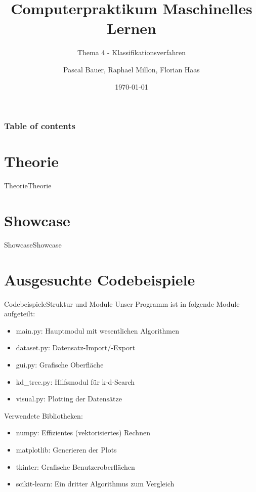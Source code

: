 \documentclass[9pt]{beamer}
\title{Computerpraktikum Maschinelles Lernen}
\subtitle{Thema 4 - Klassifikationsverfahren}
\author{Pascal Bauer, Raphael Millon, Florian Haas}
\institute{Sommersemester 2020}
\date{\today}
\begin{document}
\titlepage 

\begin{frame}
 \frametitle{Table of contents}
 \tableofcontents
\end{frame}

\section{Theorie}
\begin{frame}{Theorie}{Theorie}

\end{frame}

\section{Showcase}
\begin{frame}{Showcase}{Showcase}

\end{frame}

\section{Ausgesuchte Codebeispiele}
\begin{frame}{Codebeispiele}{Struktur und Module}
Unser Programm ist in folgende Module aufgeteilt:
\begin{itemize}
\item{main.py: Hauptmodul mit wesentlichen Algorithmen}
\item{dataset.py: Datensatz-Import/-Export}
\item{gui.py: Grafische Oberfläche}
\item{kd\_tree.py: Hilfsmodul für k-d-Search}
\item{visual.py: Plotting der Datensätze}
\end{itemize}

Verwendete Bibliotheken:
\begin{itemize}
\item{numpy: Effizientes (vektorisiertes) Rechnen}
\item{matplotlib: Generieren der Plots}
\item{tkinter: Grafische Benutzeroberflächen}
\item{scikit-learn: Ein dritter Algorithmus zum Vergleich}
\end{itemize}

\end{frame}
\end{document}
